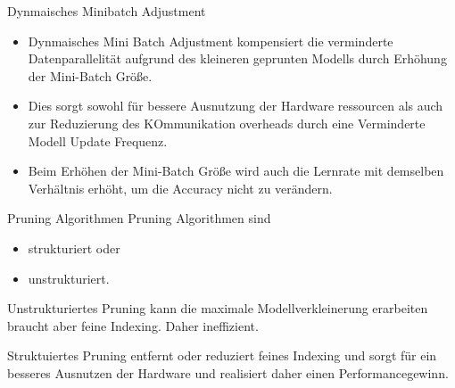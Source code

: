 \documentclass[10pt]{beamer}
\begin{document}
\begin{frame}{Dynmaisches Minibatch Adjustment}
\begin{itemize}
 \item Dynmaisches Mini Batch Adjustment kompensiert die verminderte Datenparallelität aufgrund des kleineren geprunten Modells durch Erhöhung der Mini-Batch Größe.
 \item Dies sorgt sowohl für bessere Ausnutzung der Hardware ressourcen als auch zur Reduzierung des KOmmunikation overheads durch eine Verminderte Modell Update Frequenz.
 \item Beim Erhöhen der Mini-Batch Größe wird auch die Lernrate mit demselben Verhältnis erhöht, um die Accuracy nicht zu verändern.
 \end{itemize}
 
\end{frame}


\begin{frame}{Pruning Algorithmen}
Pruning Algorithmen sind
\begin{itemize}
 \item strukturiert oder
 \item unstrukturiert.
\end{itemize}
Unstrukturiertes Pruning kann die maximale Modellverkleinerung erarbeiten braucht aber feine Indexing. Daher ineffizient.

Struktuiertes Pruning entfernt oder reduziert feines Indexing und sorgt für ein besseres Ausnutzen der Hardware und realisiert daher einen Performancegewinn.
\end{frame}
\end{document}
